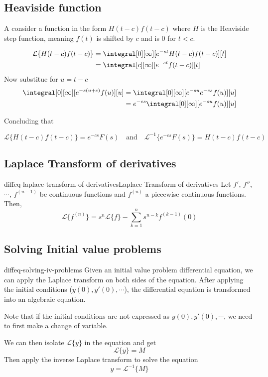\documentclass[preview]{standalone}
\begin{document}
\subsection{Heaviside function}


A consider a function in the form \(H(t-c)f(t-c)\) where \(H\) is the
Heaviside step function, meaning \(f(t)\) is shifted by \(c\) and is \(0\) for \(t < c\).

\begin{align*}
    \mathcal{L}\{H(t-c)f(t-c)\} &=
    \integral[0][\infty][e^{-st}H(t-c)f(t-c)][t] \\
    &= \integral[c][\infty][e^{-st}f(t-c)][t]
\end{align*}
Now substitue for \(u=t-c\)
\begin{align*}
    \integral[0][\infty][e^{-s(u+c)}f(u)][u]
    &= \integral[0][\infty][e^{-su}e^{-cs}f(u)][u] \\
    &= e^{-cs} \integral[0][\infty][e^{-su}f(u)][u]
\end{align*}

Concluding that

\[
    \mathcal{L}\{H(t-c)f(t-c)\} =
    e^{-cs}F(s)
    \quad
    \text{and}
    \quad
    {\mathcal{L}}^{-1}\{e^{-cs}F(s)\} =
    H(t-c)f(t-c)
\]

\subsection{Laplace Transform of derivatives}

\begin{snippettheorem}{diffeq-laplace-transform-of-derivatives}{Laplace Transform of derivatives}
    Let \(f'\), \(f''\), \(\cdots\), \(f^{(n-1)}\) be continuous functions
    and \(f^{(n)}\) a piecewise continuous functions. Then,
    \[
        \mathcal{L}\{f^{(n)}\} =
        s^n \mathcal{L}\{f\} -
        \sum_{k=1}^n s^{n-k}f^{(k-1)}(0)
    \]
\end{snippettheorem}

\subsection{Solving Initial value problems}

\begin{snippet}{diffeq-solving-iv-problems}
Given an initial value problem differential equation, we can apply the Laplace
transform on both sides of the equation. After applying the initial conditions
(\(y(0), y'(0), \cdots\)), the differential equation is transformed into an algebraic equation.

Note that if the initial conditions are not expressed as  \(y(0), y'(0), \cdots\),
we need to first make a change of variable.

We can then isolate \(\mathcal{L}\{y\}\) in the equation and get
\[
    \mathcal{L}\{y\} = M
\]
Then apply the inverse Laplace transform to solve the equation
\[
    y={\mathcal{L}}^{-1}\{M\}
\]
\end{snippet}

\end{document}
